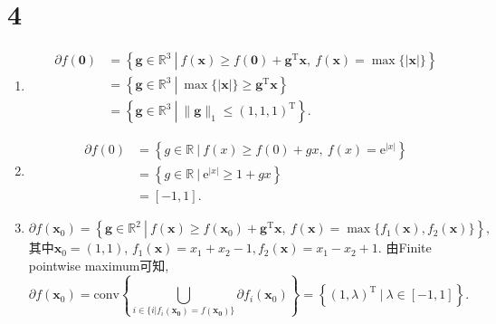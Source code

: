 \section*{4}

\begin{enumerate}[label=(\arabic*)]
    \item
        \begin{align*}
            \partial f(\bm{0})
            &=\left\{ \bm{g}\in\mathbb{R}^3 ~ \left| ~ f(\bm{x}) \geq f(\bm{0})+\bm{g}^\mathrm{T}\bm{x}, ~ f(\bm{x})=\max\{|\bm{x}|\} \right.\right\} \\
            &=\left\{ \bm{g}\in\mathbb{R}^3 ~ \left| ~ \max\{|\bm{x}|\} \geq\bm{g}^\mathrm{T}\bm{x} \right.\right\} \\
            &=\left\{ \bm{g}\in\mathbb{R}^3 ~ \left| ~ \|\bm{g}\|_1 \leq(1,1,1)^\mathrm{T} \right.\right\}.
        \end{align*}

    \item
        \begin{align*}
            \partial f(0)
            &= \left\{ g\in\mathbb{R} ~ | ~ f(x) \geq f(0)+gx, ~ f(x)=\mathrm{e}^{|x|} \right\} \\
            &=\left\{ g\in\mathbb{R} ~ | ~ \mathrm{e}^{|x|} \geq 1+gx \right\} \\
            &=[-1,1].
        \end{align*}

    \item
        \begin{equation*}
            \partial f(\bm{x}_0)
            =\left\{ \bm{g}\in\mathbb{R}^2 ~ \left| ~ f(\bm{x}) \geq f(\bm{x}_0)+\bm{g}^\mathrm{T}\bm{x}, ~ f(\bm{x})=\max\{f_1(\bm{x}), f_2(\bm{x})\} \right.\right\},
        \end{equation*}
        其中$\bm{x}_0=(1,1)$, $f_1(\bm{x})=x_1+x_2-1, f_2(\bm{x})=x_1-x_2+1$.
        由Finite pointwise maximum可知,
        \begin{equation*}
            \partial f(\bm{x}_0)
            =\mathrm{conv}\left\{\bigcup_{i\in\{i|f_i(\bm{x_0})=f(\bm{x_0})\}}\partial f_i(\bm{x}_0)\right\}
            =\left\{ (1, \lambda)^\mathrm{T} ~ \left| ~ \lambda\in[-1,1] \right.\right\}.
        \end{equation*}
\end{enumerate}
